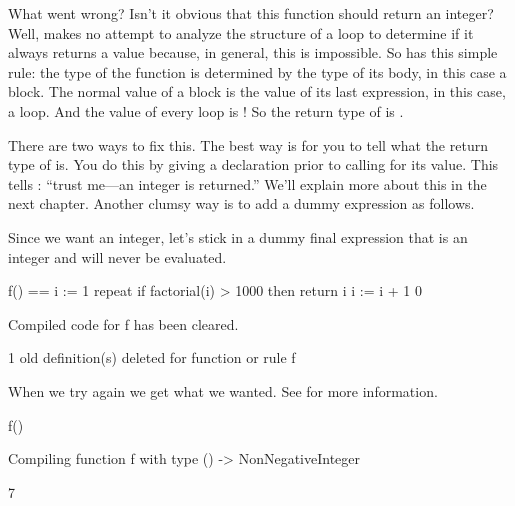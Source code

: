 {What went wrong?
Isn't it obvious that this function should return an integer?
Well, \Language{} makes no attempt to analyze the structure of a
loop to determine if it always returns a value because, in
general, this is impossible.
So \Language{} has this simple rule: the type of the function is
determined by the type of its body, in this case a block.
The normal value of a block is the value of its last expression,
in this case, a loop.
And the value of every loop is \void{}!
So the return type of  is .

There are two ways to fix this.
The best way is for you to tell \Language{} what the return type
of  is.
You do this by giving  a declaration 
prior to calling for its value.
This tells \Language{}: ``trust me---an integer is returned.''
We'll explain more about this in the next chapter.
Another clumsy way is to add a dummy expression as follows.

\begin{xtc}
\begin{xtccomment}
Since we want an integer, let's stick in a dummy final expression that is
an integer and will never be evaluated.
\end{xtccomment}
\begin{spadsrc}
f() ==
  i := 1
  repeat
    if factorial(i) > 1000 then return i
    i := i + 1
  0
\end{spadsrc}
\begin{MessageOutput}
   Compiled code for f has been cleared.
\end{MessageOutput}
\begin{MessageOutput}
   1 old definition(s) deleted for function or rule f 
\end{MessageOutput}
\end{xtc}
\begin{xtc}
\begin{xtccomment}
When we try  again we get what we wanted.
See
for more information.
\end{xtccomment}
\begin{spadsrc}
f() 
\end{spadsrc}
\begin{MessageOutput}
   Compiling function f with type () -> NonNegativeInteger 
\end{MessageOutput}
\begin{TeXOutput}
\begin{fricasmath}{4}
7%
\end{fricasmath}
\end{TeXOutput}
\end{xtc}

}
